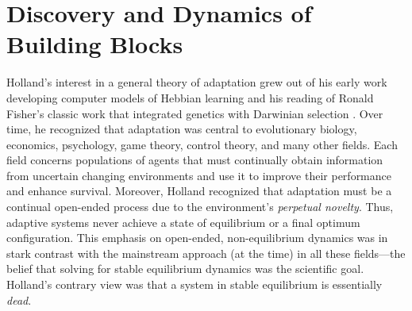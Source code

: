 \documentclass{sig-alternate}
\begin{document}
\section{Discovery and Dynamics of Building Blocks} 

Holland's interest in a general theory of adaptation grew out of
his early work developing computer models of Hebbian learning
\cite{Rochester1956} and 
his reading of 
Ronald Fisher's classic work that
integrated genetics with Darwinian selection \cite{Fisher1930}.
Over time, he recognized that adaptation was central to 
evolutionary biology,
economics, psychology, game theory, control theory, and many other fields.
Each field concerns populations of agents that must continually
obtain information from uncertain changing environments and use it to
improve their performance and enhance survival.
Moreover, Holland recognized that adaptation must be a continual
open-ended process due to the
environment's \emph{perpetual novelty}.
Thus, adaptive systems never achieve a state of equilibrium or a final
optimum configuration.  This emphasis on open-ended, non-equilibrium
dynamics was in stark contrast with the mainstream approach (at the
time) in all these fields---the belief that solving for stable
equilibrium dynamics was the scientific goal.  Holland's contrary view
was that a system in stable equilibrium is essentially \emph{dead}.

\end{document}
